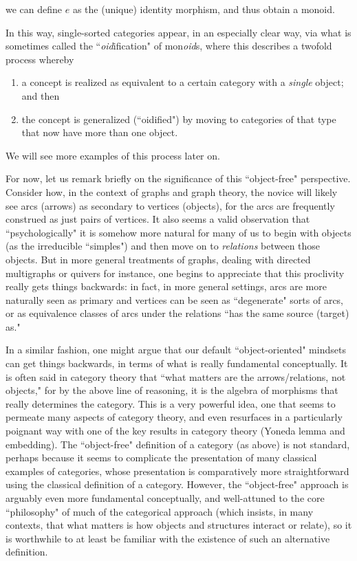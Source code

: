 \documentclass[11pt]{book}
\theoremstyle{definition}
\theoremstyle{definition}
\theoremstyle{definition}
\theoremstyle{theorem}
\theoremstyle{definition}
\begin{document}
we can define $e$ as the (unique) identity morphism, and thus obtain a monoid. \par 
In this way, single-sorted categories appear, in an especially clear way, via what is sometimes called the ``\textit{oid}ification"  of mon\textit{oid}s, where this describes a twofold process whereby 
\begin{enumerate}
	\item a concept is realized as equivalent to a certain category with a \textit{single} object; and then 
	\item the concept is generalized (``oidified") by moving to categories of that type that now have more than one object.  
\end{enumerate} 
We will see more examples of this process later on. \par 
For now, let us remark briefly on the significance of this ``object-free" perspective. Consider how, in the context of graphs and graph theory, the novice will likely see arcs (arrows) as secondary to vertices (objects), for the arcs are frequently construed as just pairs of vertices. It also seems a valid observation that ``psychologically" it is somehow more natural for many of us to begin with objects (as the irreducible ``simples") and then move on to \textit{relations} between those objects. But in more general treatments of graphs, dealing with directed multigraphs or quivers for instance, one begins to appreciate that this proclivity really gets things backwards: in fact, in more general settings, arcs are more naturally seen as primary and vertices can be seen as ``degenerate" sorts of arcs, or as equivalence classes of arcs under the relations ``has the same source (target) as." \par 
In a similar fashion, one might argue that our default ``object-oriented" mindsets can get things backwards, in terms of what is really fundamental conceptually. It is often said in category theory that ``what matters are the arrows/relations, not objects," for by the above line of reasoning, it is the algebra of morphisms that really determines the category. This is a very powerful idea, one that seems to permeate many aspects of category theory, and even resurfaces in a particularly poignant way with one of the key results in category theory (Yoneda lemma and embedding). The ``object-free" definition of a category (as above) is not standard, perhaps because it seems to complicate the presentation of many classical examples of categories, whose presentation is comparatively more straightforward using the classical definition of a category. However, the ``object-free" approach is arguably even more fundamental conceptually, and well-attuned to the core ``philosophy" of much of the categorical approach (which insists, in many contexts, that what matters is how objects and structures interact or relate), so it is worthwhile to at least be familiar with the existence of such an alternative definition. 
\end{document}
